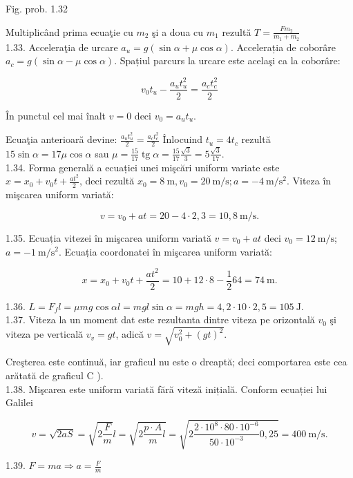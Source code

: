 Fig. prob. 1.32

Multiplicând prima ecuaţie cu $m_{2}$ şi a doua cu $m_{1}$ rezultă $T=\frac{F m_{2}}{m_{1}+m_{2}}$\\
1.33. Acceleraţia de urcare $a_{u}=g(\sin \alpha+\mu \cos \alpha)$. Accelerația de coborâre $a_{c}=g(\sin \alpha-\mu \cos \alpha)$. Spațiul parcurs la urcare este acelaşi ca la coborâre:

$$
v_{0} t_{u}-\frac{a_{u} t_{u}^{2}}{2}=\frac{a_{c} t_{c}^{2}}{2}
$$

În punctul cel mai înalt $v=0$ deci $v_{0}=a_{u} t_{u}$.

Ecuaţia anterioară devine: $\frac{a_{u} t_{u}^{2}}{2}=\frac{a_{c} t_{c}^{2}}{2}$ Înlocuind $t_{u}=4 t_{c}$ rezultă $15 \sin \alpha=17 \mu \cos \alpha$ sau $\mu=\frac{15}{17} \operatorname{tg} \alpha=\frac{15}{17} \frac{\sqrt{3}}{3}=5 \frac{\sqrt{3}}{17}$.\\
1.34. Forma generală a ecuației unei mişcări uniform variate este $x=x_{0}+v_{0} t+\frac{a t^{2}}{2}$, deci rezultă $x_{0}=8 \mathrm{~m}, v_{0}=20 \mathrm{~m} / \mathrm{s} ; a=-4 \mathrm{~m} / \mathrm{s}^{2}$. Viteza în mişcarea uniform variată:

$$
v=v_{0}+a t=20-4 \cdot 2,3=10,8 \mathrm{~m} / \mathrm{s} .
$$

1.35. Ecuația vitezei în mişcarea uniform variată $v=v_{0}+a t$ deci $v_{0}=12 \mathrm{~m} / \mathrm{s}$; $a=-1 \mathrm{~m} / \mathrm{s}^{2}$. Ecuația coordonatei în mişcarea uniform variată:

$$
x=x_{0}+v_{0} t+\frac{a t^{2}}{2}=10+12 \cdot 8-\frac{1}{2} 64=74 \mathrm{~m} .
$$

1.36. $L=F_{f} l=\mu m g \cos \alpha l=m g l \sin \alpha=m g h=4,2 \cdot 10 \cdot 2,5=105 \mathrm{~J}$.\\
1.37. Viteza la un moment dat este rezultanta dintre viteza pe orizontală $v_{0}$ şi viteza pe verticală $v_{v}=g t$, adică $v=\sqrt{v_{0}^{2}+(g t)^{2}}$.

Creşterea este continuă, iar graficul nu este o dreaptă; deci comportarea este cea arătată de graficul C ).\\
1.38. Mişcarea este uniform variată fără viteză inițială. Conform ecuației lui Galilei

$$
v=\sqrt{2 a S}=\sqrt{2 \frac{F}{m}} l=\sqrt{2 \frac{p \cdot A}{m} l}=\sqrt{2 \frac{2 \cdot 10^{8} \cdot 80 \cdot 10^{-6}}{50 \cdot 10^{-3}} 0,25}=400 \mathrm{~m} / \mathrm{s} .
$$

1.39. $F=m a \Rightarrow a=\frac{F}{m}$

